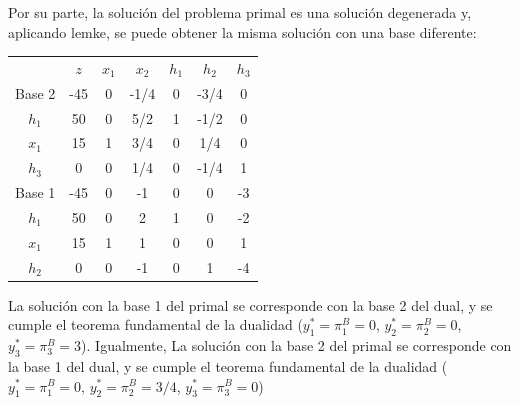 

Por su parte, la solución del problema primal es una solución degenerada y, aplicando lemke, se puede obtener la misma solución con una base diferente:


\begin{center}
\begin{tabular}{c|c|ccccc|}
 & $z$ & $x_1$ & $x_2$ & $h_1$ & $h_2$ & $h_3$\\ 
Base 2 & -45 & 0 & -1/4 & 0 & -3/4 & 0 \\ 
\hline
$h_1$ & 50  & 0 & 5/2 & 1 & -1/2 & 0\\ 
$x_1$ & 15  & 1 & 3/4 & 0 & 1/4 & 0\\ 
$h_3$ & 0  & 0 & 1/4 & 0 & -1/4 & 1\\ 
\hline
Base 1 & -45 & 0 & -1 & 0 & 0 & -3 \\ 
\hline
$h_1$ & 50  & 0 & 2 & 1 & 0 & -2\\ 
$x_1$ & 15  & 1 & 1 & 0 & 0 & 1\\ 
$h_2$ & 0  & 0 & -1 & 0 & 1 & -4\\ 
\hline
\end{tabular}
\end{center}


La solución con la base 1 del primal se corresponde con la base 2 del dual, y se cumple el teorema fundamental de la dualidad ($y_1^*=\pi^B_1=0$, $y_2^*=\pi^B_2=0$,  $y_3^*=\pi^B_3=3$). Igualmente, La solución con la base 2 del primal se corresponde con la base 1 del dual, y se cumple el teorema fundamental de la dualidad ($y_1^*=\pi^B_1=0$, $y_2^*=\pi^B_2=3/4$, $y_3^*=\pi^B_3=0$)


